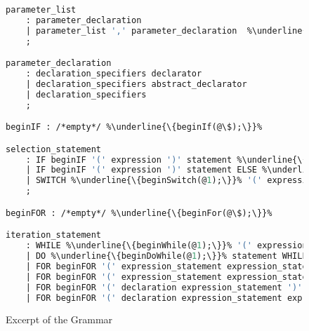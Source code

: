 \documentclass[12pt]{report}
\begin{document}
\begin{figure} 
\begin{lstlisting}[language=Caml, escapechar=\%]
parameter_list
	: parameter_declaration											%\underline{\{h\_registerParameter(@\$);\}}%
	| parameter_list ',' parameter_declaration	%\underline{\{h\_registerParameter(@3);\}}%
	;

parameter_declaration
	: declaration_specifiers declarator
	| declaration_specifiers abstract_declarator
	| declaration_specifiers
	;

beginIF : /*empty*/ %\underline{\{beginIf(@\$);\}}%

selection_statement
	: IF beginIF '(' expression ')' statement %\underline{\{endIf(@\$);\}}%
	| IF beginIF '(' expression ')' statement ELSE %\underline{\{endIf(@6); beginElse(@7);\}}% statement	%\underline{\{endElse(@9);\}}%
	| SWITCH %\underline{\{beginSwitch(@1);\}}% '(' expression ')' statement %\underline{\{endSwitch(@\$);\}}%
	;

beginFOR : /*empty*/ %\underline{\{beginFor(@\$);\}}%

iteration_statement
	: WHILE %\underline{\{beginWhile(@1);\}}% '(' expression ')' statement %\underline{\{endWhile(@\$);\}}%
	| DO %\underline{\{beginDoWhile(@1);\}}% statement WHILE '(' expression ')' ';' %\underline{\{endDoWhile(@\$);\}}%
	| FOR beginFOR '(' expression_statement expression_statement ')' statement	%\underline{\{endFor(@\$);\}}%
	| FOR beginFOR '(' expression_statement expression_statement expression ')' statement %\underline{\{endFor(@\$);\}}%
	| FOR beginFOR '(' declaration expression_statement ')' statement %\underline{\{endFor(@\$);\}}%
	| FOR beginFOR '(' declaration expression_statement expression ')' statement	%\underline{\{endFor(@\$);\}}%

\end{lstlisting}
\caption{Excerpt of the Grammar}
\label{grammar}
\end{figure} 
\end{document}
